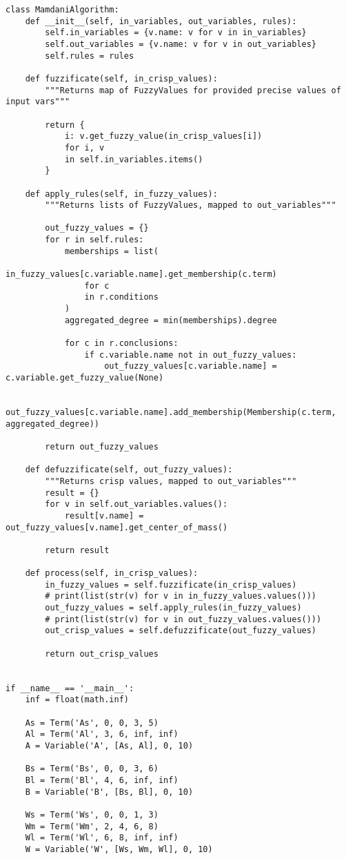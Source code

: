 \begin{lstlisting}[style=pythonstyle,caption={ }, label=lst:func:1]
class MamdaniAlgorithm:
	def __init__(self, in_variables, out_variables, rules):
		self.in_variables = {v.name: v for v in in_variables}
		self.out_variables = {v.name: v for v in out_variables}
		self.rules = rules

	def fuzzificate(self, in_crisp_values):
		"""Returns map of FuzzyValues for provided precise values of input vars"""

		return {
			i: v.get_fuzzy_value(in_crisp_values[i])
			for i, v
			in self.in_variables.items()
		}

	def apply_rules(self, in_fuzzy_values):
		"""Returns lists of FuzzyValues, mapped to out_variables"""

		out_fuzzy_values = {}
		for r in self.rules:
			memberships = list(
				in_fuzzy_values[c.variable.name].get_membership(c.term)
				for c
				in r.conditions
			)
			aggregated_degree = min(memberships).degree

			for c in r.conclusions:
				if c.variable.name not in out_fuzzy_values:
					out_fuzzy_values[c.variable.name] = c.variable.get_fuzzy_value(None)

				out_fuzzy_values[c.variable.name].add_membership(Membership(c.term, aggregated_degree))

		return out_fuzzy_values

	def defuzzificate(self, out_fuzzy_values):
		"""Returns crisp values, mapped to out_variables"""
		result = {}
		for v in self.out_variables.values():
			result[v.name] = out_fuzzy_values[v.name].get_center_of_mass()

		return result

	def process(self, in_crisp_values):
		in_fuzzy_values = self.fuzzificate(in_crisp_values)
		# print(list(str(v) for v in in_fuzzy_values.values()))
		out_fuzzy_values = self.apply_rules(in_fuzzy_values)
		# print(list(str(v) for v in out_fuzzy_values.values()))
		out_crisp_values = self.defuzzificate(out_fuzzy_values)

		return out_crisp_values


if __name__ == '__main__':
	inf = float(math.inf)

	As = Term('As', 0, 0, 3, 5)
	Al = Term('Al', 3, 6, inf, inf)
	A = Variable('A', [As, Al], 0, 10)

	Bs = Term('Bs', 0, 0, 3, 6)
	Bl = Term('Bl', 4, 6, inf, inf)
	B = Variable('B', [Bs, Bl], 0, 10)

	Ws = Term('Ws', 0, 0, 1, 3)
	Wm = Term('Wm', 2, 4, 6, 8)
	Wl = Term('Wl', 6, 8, inf, inf)
	W = Variable('W', [Ws, Wm, Wl], 0, 10)


\end{lstlisting}
